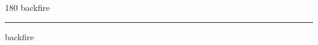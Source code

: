 
\begin{frame}
\begin{center}
\begin{turn}{180}
{\fontsize{2.5cm}{1em}\selectfont backfire}
\end{turn}
\vspace{1em}\par  
\hrule
\vspace{1em}\par  
{\fontsize{2.5cm}{1em}\selectfont backfire}
\end{center}
\end{frame}
